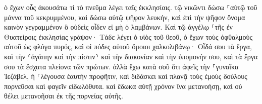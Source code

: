 \documentclass{openreader}
\begin{document}
ὁ ἔχων οὖς ἀκουσάτω τί τὸ πνεῦμα λέγει ταῖς ἐκκλησίαις. τῷ νικῶντι δώσω ⸀αὐτῷ τοῦ μάννα τοῦ κεκρυμμένου, καὶ δώσω αὐτῷ ψῆφον λευκήν, καὶ ἐπὶ τὴν ψῆφον ὄνομα καινὸν γεγραμμένον ὃ οὐδεὶς οἶδεν εἰ μὴ ὁ λαμβάνων. 
Καὶ τῷ ἀγγέλῳ ⸀τῆς ἐν Θυατείροις ἐκκλησίας γράψον· Τάδε λέγει ὁ υἱὸς τοῦ θεοῦ, ὁ ἔχων τοὺς ὀφθαλμοὺς αὐτοῦ ὡς φλόγα πυρός, καὶ οἱ πόδες αὐτοῦ ὅμοιοι χαλκολιβάνῳ· 
Οἶδά σου τὰ ἔργα, καὶ τὴν ⸂ἀγάπην καὶ τὴν πίστιν⸃ καὶ τὴν διακονίαν καὶ τὴν ὑπομονήν σου, καὶ τὰ ἔργα σου τὰ ἔσχατα πλείονα τῶν πρώτων. 
ἀλλὰ ἔχω κατὰ σοῦ ὅτι ἀφεῖς τὴν ⸀γυναῖκα Ἰεζάβελ, ἡ ⸀λέγουσα ἑαυτὴν προφῆτιν, καὶ διδάσκει καὶ πλανᾷ τοὺς ἐμοὺς δούλους πορνεῦσαι καὶ φαγεῖν εἰδωλόθυτα. 
καὶ ἔδωκα αὐτῇ χρόνον ἵνα μετανοήσῃ, καὶ οὐ θέλει μετανοῆσαι ἐκ τῆς πορνείας αὐτῆς. 
\end{document}

